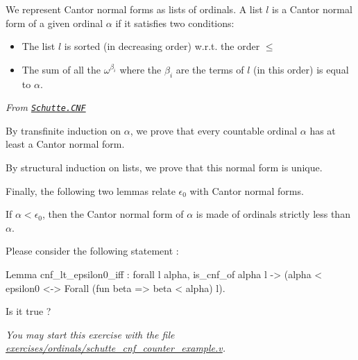
We represent  Cantor normal forms as lists of ordinals.
A  list $l$ is a Cantor normal form of a given ordinal $\alpha$ if it satisfies two conditions:



\begin{itemize}
\item The list  $l$ is sorted (in decreasing order) w.r.t. the order $\leq$
\item The sum of all the  $\omega^{\beta_i}$ where the $\beta_i$ are the terms of $l$ (in this order) is equal to $\alpha$.
\end{itemize}



\vspace{4pt}

\noindent\emph{From \href{../theories/html/hydras.Schutte.CNF.html\#cnf_t}%
{\texttt{Schutte.CNF}}}






By transfinite induction on $\alpha$, we prove that every countable ordinal $\alpha$ 
 has at least a Cantor normal form.



By structural induction on lists, we prove that this normal form is unique.





Finally, the following two lemmas relate  $\epsilon_0$ with Cantor normal forms.

If $\alpha<\epsilon_0$, then the Cantor normal form of $\alpha$ is made of ordinals strictly less than $\alpha$.






\begin{exercise}
Please consider the following statement :

\begin{Coqsrc}
Lemma cnf_lt_epsilon0_iff : 
 forall l alpha, 
   is_cnf_of alpha l ->  
   (alpha < epsilon0 <->  Forall (fun beta =>  beta < alpha) l).
\end{Coqsrc}

Is it true ?

\emph{You may start this exercise with the file
    \href{https://github.com/coq-community/hydra-battles/tree/master/exercises/ordinals/schutte_cnf_counter_example.v}{exercises/ordinals/schutte\_cnf\_counter\_example.v}.}
\end{exercise}

